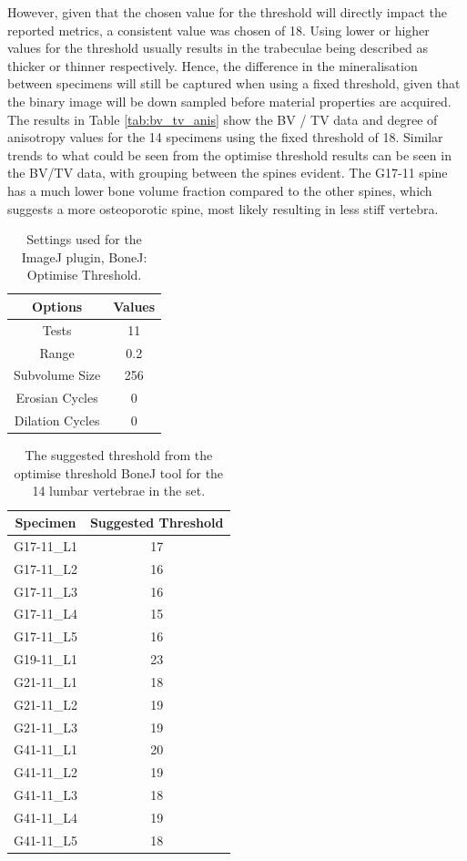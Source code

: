 However, given that the chosen value for the threshold will directly impact the reported metrics, a consistent value was chosen of 18. Using lower or higher values for the threshold usually results in the trabeculae being described as thicker or thinner respectively.
Hence, the difference in the mineralisation between specimens will still be captured when using a fixed threshold, given that the binary image will be down sampled before material properties are acquired.
The results in Table \ref{tab:bv_tv_anis} show the BV / TV data and degree of anisotropy values for the 14 specimens using the fixed threshold of 18.
Similar trends to what could be seen from the optimise threshold results can be seen in the BV/TV data, with grouping between the
spines evident.
The G17-11 spine has a much lower bone volume fraction compared to the other spines, which suggests a more osteoporotic spine, most likely resulting in less stiff vertebra.

\begin{table}[ht!]
	\caption{Settings used for the ImageJ plugin, BoneJ: Optimise Threshold.}
	\label{tab:bonej}
	\centering
	\begin{tabular}{c|c}
    Options & Values \\
    \hline
    \hline
    Tests & 11  \\
    Range & 0.2 \\
    Subvolume Size & 256 \\
    Erosian Cycles & 0 \\
    Dilation Cycles & 0 \\
    \hline
	\end{tabular}
\end{table}

\begin{table}[ht!]
	\caption{The suggested threshold from the optimise threshold BoneJ tool for the 14 lumbar vertebrae in the set.}
	\label{tab:optTH}
	\centering
	\begin{tabular}{c|c}
    Specimen    & Suggested Threshold   \\ \hline \hline
    G17-11\_L1 & 17 \\
    G17-11\_L2 & 16\\
    G17-11\_L3 & 16\\
    G17-11\_L4 & 15\\
    G17-11\_L5 & 16\\
    G19-11\_L1 & 23\\
    G21-11\_L1 & 18\\
    G21-11\_L2 & 19\\
    G21-11\_L3 & 19\\
    G41-11\_L1 & 20\\
    G41-11\_L2 & 19\\
    G41-11\_L3 & 18\\
    G41-11\_L4 & 19\\
    G41-11\_L5 & 18\\
    \hline
	\end{tabular}
\end{table}

